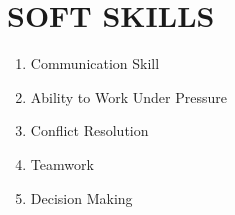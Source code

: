 \documentclass[paper=a4,fontsize=12pt]{scrartcl}
\newcommand{\NewPart}[1]{\section*{\uppercase{#1}}}
\begin{document}
\NewPart{Soft Skills}{}
\begin{enumerate}
\item Communication Skill
\item Ability to Work Under Pressure
\item Conflict Resolution
\item Teamwork
\item Decision Making
\end{enumerate}
\end{document}

